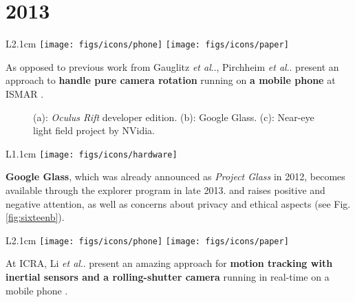 \documentclass[12pt,a4paper]{article}
\makeatletter
\DeclareRobustCommand\onedot{\futurelet\@let@token\@onedot}
\def\@onedot{\ifx\@let@token.\else.\null\fi\xspace}
\def\etal{\emph{et al}\onedot}
\makeatother
\begin{document}
\vspace{-0pt}
\section*{2013}

\begin{wrapfigure}{L}{2.1cm}
	\vspace{-15pt}	
	\texttt{[image: figs/icons/phone]}	
	\texttt{[image: figs/icons/paper]}
	\vspace{-25pt}		
\end{wrapfigure}
As opposed to previous work from Gauglitz \etal, Pirchheim \etal present an approach to \textbf{handle pure camera rotation} running on \textbf{a mobile phone} at ISMAR \cite{Pirchheim13}.

\vspace{0.1in}

\begin{figure}[tbp]
\centering
\vspace{-15pt}
 \hfill 
{}
\vspace{-10pt}
\caption{ (a): \emph{Oculus Rift} developer edition. (b): Google Glass. (c): Near-eye light field project by NVidia.}
\label{fig:sixteen}
\end{figure}

\begin{wrapfigure}{L}{1.1cm}
	\vspace{-15pt}	
	\texttt{[image: figs/icons/hardware]}
	\vspace{-15pt}		
\end{wrapfigure} 
\noindent \textbf{Google Glass}, which was already announced as \emph{Project Glass} in 2012, becomes available through the explorer program in late 2013. and raises positive and negative attention, as well as concerns about privacy and ethical aspects (see Fig.\ref{fig:sixteenb}).

\vspace{0.1in}

\begin{wrapfigure}{L}{2.1cm}
	\vspace{-15pt}	
	\texttt{[image: figs/icons/phone]}
	\texttt{[image: figs/icons/paper]}
	\vspace{-25pt}		
\end{wrapfigure} 
\noindent At ICRA, Li \etal present an amazing approach for \textbf{motion tracking with inertial sensors and a rolling-shutter camera} running in real-time on a mobile phone \cite{Li13}.
\end{document}

